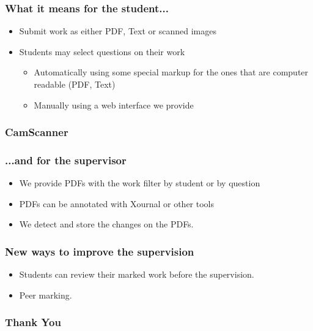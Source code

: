 \documentclass{beamer}
\begin{document}
    \begin{frame}
    	\frametitle{What it means for the student...}
    	\begin{itemize}
        
    		\item Submit work as either PDF, Text or scanned images
    		\item Students may select questions on their work
    		\begin{itemize}
    			\item Automatically using some special markup for the ones that are computer readable (PDF, Text)
    			\item Manually using a web interface we provide   			
        \end{itemize}
    	\end{itemize}    	
    \end{frame}
    {
      \begin{frame}[plain]
        \frametitle{CamScanner}
      \end{frame}
    }
    \begin{frame}
    	\frametitle{...and for the supervisor}
    	\begin{itemize}
    		\item We provide PDFs with the work filter by student or by question
    		\item PDFs can be annotated with Xournal or other tools
    		\item We detect and store the changes on the PDFs.
    	\end{itemize}
    \end{frame}
    
    \begin{frame}
    	\frametitle{New ways to improve the supervision}
    	\begin{itemize}
    		\item Students can review their marked work before the supervision.
    		\item Peer marking.
    	\end{itemize}
    \end{frame}
    \begin{frame}
    	\frametitle{Thank You}
    \end{frame}
\end{document}
